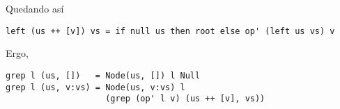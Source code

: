 Quedando así

\begin{verbatim}
left (us ++ [v]) vs = if null us then root else op' (left us vs) v
\end{verbatim}

Ergo, 

\begin{verbatim}
grep l (us, [])   = Node(us, []) l Null
grep l (us, v:vs) = Node(us, v:vs) l
                    (grep (op' l v) (us ++ [v], vs))
\end{verbatim}


